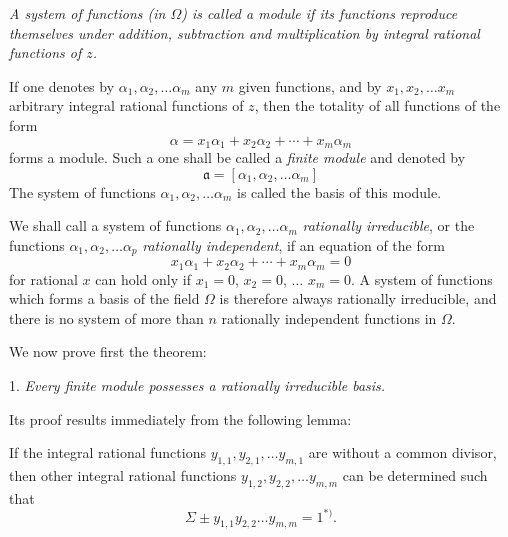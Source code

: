 \documentclass{article}
\begin{document}
\emph{A system of functions (in $\Omega$) is called a module if its functions reproduce themselves under addition, subtraction and multiplication by integral rational functions of $z$.}

If one denotes by $\alpha_{1}, \alpha_{2}, \ldots \alpha_{m}$ any $m$ given functions, and by $x_{1}, x_{2}, \ldots x_{m}$ arbitrary integral rational functions of $z$, then the totality of all functions of the form
\[ \alpha = x_{1}\alpha_{1} + x_{2}\alpha_{2} + \cdots + x_{m}\alpha_{m} \]
forms a module. Such a one shall be called a \emph{finite module} and denoted by
\[ \mathfrak{a} = [\alpha_{1}, \alpha_{2}, \ldots \alpha_{m}] \]
The system of functions $\alpha_{1}, \alpha_{2}, \ldots \alpha_{m}$ is called the basis of this module.

We shall call a system of functions $\alpha_{1}, \alpha_{2}, \ldots \alpha_{m}$ \emph{rationally irreducible}, or the functions $\alpha_{1}, \alpha_{2}, \ldots \alpha_{p}$ \emph{rationally independent}, if an equation of the form
\[ x_{1}\alpha_{1} + x_{2}\alpha_{2} + \cdots + x_{m}\alpha_{m} = 0 \]
for rational $x$ can hold only if $x_{1} = 0$, $x_{2} = 0$, $\ldots$ $x_{m} = 0$. A system of functions which forms a basis of the field $\Omega$ is therefore always rationally irreducible, and there is no system of more than $n$ rationally independent functions in $\Omega$.

We now prove first the theorem:

1. \emph{Every finite module possesses a rationally irreducible basis.}

Its proof results immediately from the following lemma:

If the integral rational functions $y_{1,1}, y_{2,1}, \ldots y_{m,1}$ are without a common divisor, then other integral rational functions $y_{1,2}, y_{2,2}, \ldots y_{m,m}$ can be determined such that
\[ \Sigma \pm y_{1,1}y_{2,2}\ldots y_{m,m} = 1{}^{*)}. \]
\end{document}
